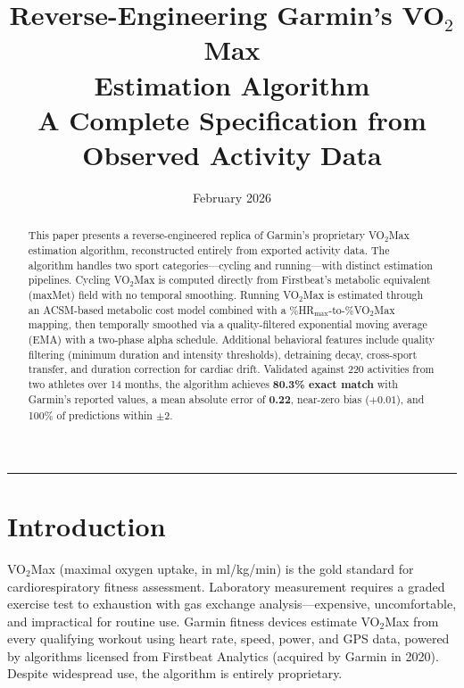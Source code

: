 \documentclass[11pt,a4paper]{article}
\title{
    \vspace{-1cm}
    \textbf{Reverse-Engineering Garmin's VO$_2$Max\\Estimation Algorithm}\\[0.5em]
    \large A Complete Specification from Observed Activity Data
}
\author{}
\date{February 2026}
\begin{document}
\maketitle
\thispagestyle{fancy}

\begin{abstract}
\noindent
This paper presents a reverse-engineered replica of Garmin's proprietary VO$_2$Max estimation algorithm, reconstructed entirely from exported activity data.
The algorithm handles two sport categories---cycling and running---with distinct estimation pipelines.
Cycling VO$_2$Max is computed directly from Firstbeat's metabolic equivalent (maxMet) field with no temporal smoothing.
Running VO$_2$Max is estimated through an ACSM-based metabolic cost model combined with a \%HR$_{\text{max}}$-to-\%VO$_2$Max mapping, then temporally smoothed via a quality-filtered exponential moving average (EMA) with a two-phase alpha schedule.
Additional behavioral features include quality filtering (minimum duration and intensity thresholds), detraining decay, cross-sport transfer, and duration correction for cardiac drift.
Validated against 220 activities from two athletes over 14 months, the algorithm achieves \textbf{80.3\% exact match} with Garmin's reported values, a mean absolute error of \textbf{0.22}, near-zero bias ($+0.01$), and 100\% of predictions within $\pm 2$.
\end{abstract}

\vspace{1em}
\hrule
\vspace{1em}

\tableofcontents

\newpage

\section{Introduction}
\label{sec:introduction}

VO$_2$Max (maximal oxygen uptake, in ml/kg/min) is the gold standard for cardiorespiratory fitness assessment.
Laboratory measurement requires a graded exercise test to exhaustion with gas exchange analysis---expensive, uncomfortable, and impractical for routine use.
Garmin fitness devices estimate VO$_2$Max from every qualifying workout using heart rate, speed, power, and GPS data, powered by algorithms licensed from Firstbeat Analytics (acquired by Garmin in 2020).
Despite widespread use, the algorithm is entirely proprietary.
\end{document}
